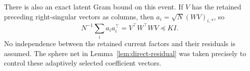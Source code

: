 There is also an exact latent Gram bound on this event. If $V$ has the retained preceding right-singular vectors as columns, then $a_i=\sqrt N(WV)_{i,*}$, so
\begin{equation}
 N^{-1}\sum_i a_ia_i^\top=V^\top W^\top WV\preceq K I.
 \label{eq:actual-latent-gram}
\end{equation}
No independence between the retained current factors and their residuals is assumed. The sphere net in Lemma~\ref{lem:direct-residual} was taken precisely to control these adaptively selected coefficient vectors.
